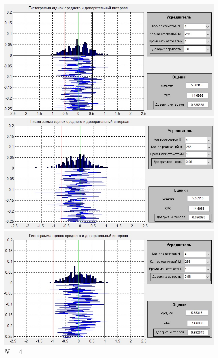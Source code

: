  \begin{figure}[H]
	\begin{minipage}{0.3\linewidth}
		\centering
		\includegraphics[width=\linewidth]{tasks/task6/realize_b1N2}
		\caption*{$\beta =0.8$}
	\end{minipage}
	\begin{minipage}{0.3\linewidth}
		\centering
		\includegraphics[width=\linewidth]{tasks/task6/realize_b2N2}
		\caption*{$\beta =0.95$}
	\end{minipage}
	\begin{minipage}{0.3\linewidth}
		\centering
		\includegraphics[width=\linewidth]{tasks/task6/realize_b3N2}
		\caption*{$\beta =0.98$}
	\end{minipage}
	\caption*{$N=4$}
	
\end{figure}
